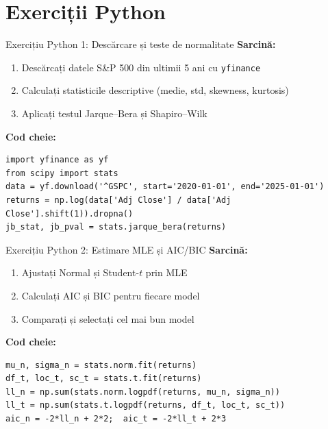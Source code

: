 \documentclass[9pt, aspectratio=169, t]{beamer}
\begin{document}
\section{Exerciții Python}

\begin{frame}[fragile]{Exercițiu Python 1: Descărcare și teste de normalitate}
    \textbf{Sarcină:}
    \begin{enumerate}\setlength{\itemsep}{0pt}
        \item Descărcați datele S\&P 500 din ultimii 5 ani cu \texttt{yfinance}
        \item Calculați statisticile descriptive (medie, std, skewness, kurtosis)
        \item Aplicați testul Jarque--Bera și Shapiro--Wilk
    \end{enumerate}

    \vspace{0.3cm}
    \textbf{Cod cheie:}
    \begin{verbatim}
import yfinance as yf
from scipy import stats
data = yf.download('^GSPC', start='2020-01-01', end='2025-01-01')
returns = np.log(data['Adj Close'] / data['Adj Close'].shift(1)).dropna()
jb_stat, jb_pval = stats.jarque_bera(returns)
    \end{verbatim}

\end{frame}

\begin{frame}[fragile]{Exercițiu Python 2: Estimare MLE și AIC/BIC}
    \textbf{Sarcină:}
    \begin{enumerate}\setlength{\itemsep}{0pt}
        \item Ajustați Normal și Student-$t$ prin MLE
        \item Calculați AIC și BIC pentru fiecare model
        \item Comparați și selectați cel mai bun model
    \end{enumerate}

    \vspace{0.3cm}
    \textbf{Cod cheie:}
    \begin{verbatim}
mu_n, sigma_n = stats.norm.fit(returns)
df_t, loc_t, sc_t = stats.t.fit(returns)
ll_n = np.sum(stats.norm.logpdf(returns, mu_n, sigma_n))
ll_t = np.sum(stats.t.logpdf(returns, df_t, loc_t, sc_t))
aic_n = -2*ll_n + 2*2;  aic_t = -2*ll_t + 2*3
    \end{verbatim}

\end{frame}
\end{document}
